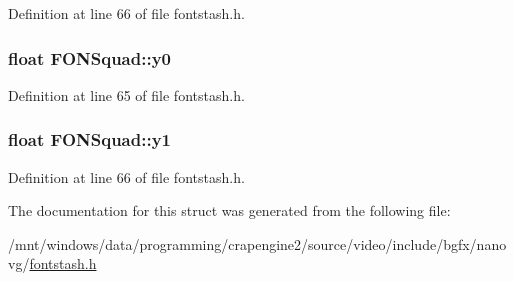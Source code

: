Definition at line 66 of file fontstash.\+h.

\hypertarget{struct_f_o_n_squad_af92a5d58d387d08575a149b3869ad994}{
\subsubsection[{y0}]{\setlength{\rightskip}{0pt plus 5cm}float F\+O\+N\+Squad\+::y0}}\label{struct_f_o_n_squad_af92a5d58d387d08575a149b3869ad994}


Definition at line 65 of file fontstash.\+h.

\hypertarget{struct_f_o_n_squad_a7d11aed083800fc600fa2b736c7eb973}{
\subsubsection[{y1}]{\setlength{\rightskip}{0pt plus 5cm}float F\+O\+N\+Squad\+::y1}}\label{struct_f_o_n_squad_a7d11aed083800fc600fa2b736c7eb973}


Definition at line 66 of file fontstash.\+h.



The documentation for this struct was generated from the following file\+:\begin{DoxyCompactItemize}
\item 
/mnt/windows/data/programming/crapengine2/source/video/include/bgfx/nanovg/\hyperlink{fontstash_8h}{fontstash.\+h}\end{DoxyCompactItemize}
